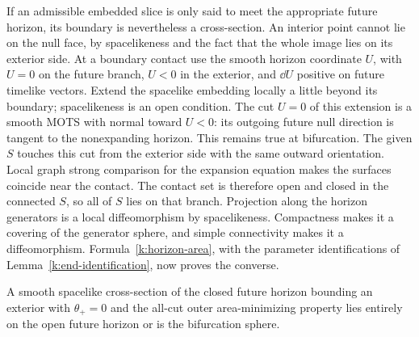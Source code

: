 If an admissible embedded slice is only said to meet the
appropriate future horizon, its boundary is nevertheless a
cross-section. An interior point cannot lie on the null face,
by spacelikeness and the fact that the whole image lies on its
exterior side. At a boundary contact use the smooth horizon
coordinate \(U\), with \(U=0\) on the future branch,
\(U<0\) in the exterior, and \(\dd U\) positive on future
timelike vectors. Extend the spacelike embedding locally a
little beyond its boundary; spacelikeness is an open condition.
The cut \(U=0\) of this extension is a smooth MOTS with normal
toward \(U<0\): its outgoing future null direction is tangent
to the nonexpanding horizon. This remains true at bifurcation.
The given \(S\) touches this cut from the exterior side with
the same outward orientation. Local graph strong comparison
for the expansion equation makes the surfaces coincide near
the contact. The contact set is therefore open and closed
in the connected \(S\), so all of \(S\) lies on that branch.
Projection along the horizon generators is a local
diffeomorphism by spacelikeness. Compactness makes it a
covering of the generator sphere, and simple connectivity
makes it a diffeomorphism. Formula~\eqref{k:horizon-area},
with the parameter identifications of
Lemma~\ref{k:end-identification}, now proves the converse.

\begin{lemma}
\label{k:horizon-cut-dichotomy}
A smooth spacelike cross-section of the closed future horizon bounding an exterior
with \(\theta_+=0\) and the all-cut outer area-minimizing property
lies entirely on the open future horizon or is the bifurcation
sphere.
\end{lemma}

